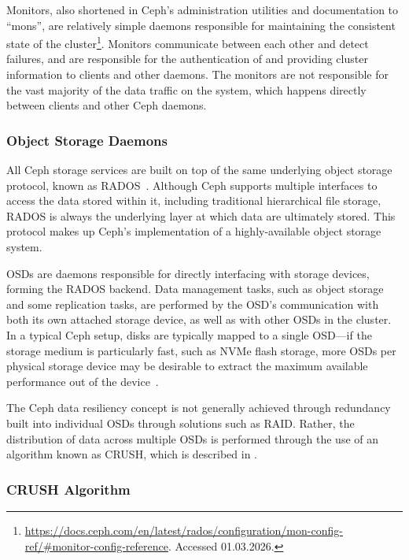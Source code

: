 Monitors, also shortened in Ceph's administration utilities and documentation to ``mons'', are relatively simple daemons responsible for maintaining the consistent state of the cluster\footnote{\url{https://docs.ceph.com/en/latest/rados/configuration/mon-config-ref/\#monitor-config-reference}. Accessed 01.03.2026.}. Monitors communicate between each other and detect failures, and are responsible for the authentication of and providing cluster information to clients and other daemons. The monitors are not responsible for the vast majority of the data traffic on the system, which happens directly between clients and other Ceph daemons.

\subsubsection{Object Storage Daemons}

All Ceph storage services are built on top of the same underlying object storage protocol, known as \ac{RADOS}~\cite{ceph-discover}. Although Ceph supports multiple interfaces to access the data stored within it, including traditional hierarchical file storage, \ac{RADOS} is always the underlying layer at which data are ultimately stored. This protocol makes up Ceph's implementation of a highly-available object storage system.

\acp{OSD} are daemons responsible for directly interfacing with storage devices, forming the \ac{RADOS} backend. Data management tasks, such as object storage and some replication tasks, are performed by the \acs{OSD}'s communication with both its own attached storage device, as well as with other \acp{OSD} in the cluster. In a typical Ceph setup, disks are typically mapped to a single \ac{OSD}---if the storage medium is particularly fast, such as \ac{NVMe} flash storage, more \acp{OSD} per physical storage device may be desirable to extract the maximum available performance out of the device~\cite{ceph-blog-osd-per-disk}. 

The Ceph data resiliency concept is not generally achieved through redundancy built into individual \acp{OSD} through solutions such as \ac{RAID}. Rather, the distribution of data across multiple \acp{OSD} is performed through the use of an algorithm known as \ac{CRUSH}, which is described in .

\subsubsection{\acs{CRUSH} Algorithm}
\label{sec:ceph-crush}


